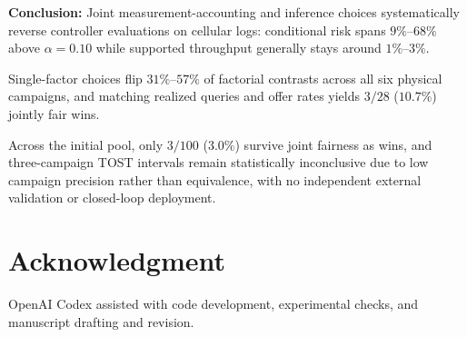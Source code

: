 \documentclass[journal,10pt]{IEEEtran}
\begin{document}
\textbf{Conclusion:} Joint measurement-accounting and inference choices systematically reverse controller evaluations on cellular logs: conditional risk spans $9\%$--$68\%$ above $\alpha=0.10$ while supported throughput generally stays around $1\%$--$3\%$.

Single-factor choices flip $31\%$--$57\%$ of factorial contrasts across all six physical campaigns, and matching realized queries and offer rates yields $3/28$ ($10.7\%$) jointly fair wins.

Across the initial pool, only $3/100$ ($3.0\%$) survive joint fairness as wins, and three-campaign TOST intervals remain statistically inconclusive due to low campaign precision rather than equivalence, with no independent external validation or closed-loop deployment.

\section*{Acknowledgment}
OpenAI Codex assisted with code development, experimental checks, and manuscript drafting and revision.


\end{document}
